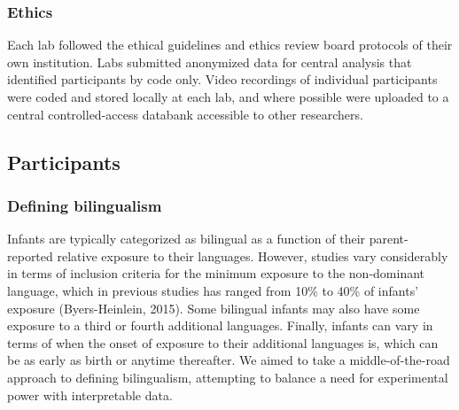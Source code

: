 \documentclass[english,,man,floatsintext]{apa6}
\begin{document}
\hypertarget{ethics}{%
\subsubsection{Ethics}\label{ethics}}

Each lab followed the ethical guidelines and ethics review board protocols of their own institution. Labs submitted anonymized data for central analysis that identified participants by code only. Video recordings of individual participants were coded and stored locally at each lab, and where possible were uploaded to a central controlled-access databank accessible to other researchers.

\hypertarget{participants}{%
\subsection{Participants}\label{participants}}

\hypertarget{defining-bilingualism}{%
\subsubsection{Defining bilingualism}\label{defining-bilingualism}}

Infants are typically categorized as bilingual as a function of their parent-reported relative exposure to their languages. However, studies vary considerably in terms of inclusion criteria for the minimum exposure to the non-dominant language, which in previous studies has ranged from 10\% to 40\% of infants' exposure (Byers-Heinlein, 2015). Some bilingual infants may also have some exposure to a third or fourth additional languages. Finally, infants can vary in terms of when the onset of exposure to their additional languages is, which can be as early as birth or anytime thereafter. We aimed to take a middle-of-the-road approach to defining bilingualism, attempting to balance a need for experimental power with interpretable data.
\end{document}

